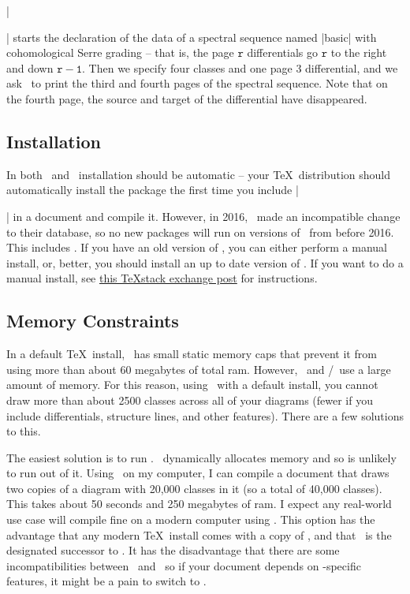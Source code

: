 \codeverb|\begin{sseqdata}[name = basic, cohomological Serre grading]| starts the declaration of the data of a spectral sequence named |basic| with cohomological Serre grading -- that is, the page $\mathtt{r}$ differentials go $\mathtt{r}$ to the right and down $\mathtt{r-1}$. Then we specify four classes and one page 3 differential, and we ask \sseqpages\  to print the third and fourth pages of the spectral sequence. Note that on the fourth page, the source and target of the differential have disappeared.

\subsection{Installation}
In both \miktex\ and \texlive\ installation should be automatic -- your \TeX\ distribution should automatically install the package the first time you include |\usepackage{spectralsequences}| in a document and compile it. However, in 2016, \texlive\ made an incompatible change to their database, so no new packages will run on versions of \texlive\ from before 2016. This includes \sseqpages. If you have an old version of \texlive, you can either perform a manual install,
or, better, you should install an up to date version of \texlive. If you want to do a manual install, see \href{https://tex.stackexchange.com/a/73017}{this \TeX stack exchange post} for instructions.

\subsection{Memory Constraints}
In a default \TeX\ install, \pdfLaTeX\ has small static memory caps that prevent it from using more than about 60 megabytes of total ram. However, \spectralsequences\ and \pgfpkg/\tikzpkg\ use a large amount of memory. For this reason, using \pdfLaTeX\ with a default install, you cannot draw more than about 2500 classes across all of your diagrams (fewer if you include differentials, structure lines, and other features). There are a few solutions to this.

The easiest solution is to run \LuaLaTeX. \LuaLaTeX\ dynamically allocates memory and so is unlikely to run out of it. Using \LuaLaTeX\ on my computer, I can compile a document that draws two copies of a diagram with 20,000 classes in it (so a total of 40,000 classes). This takes about 50 seconds and 250 megabytes of ram. I expect any real-world use case will compile fine on a modern computer using \LuaLaTeX. This option has the advantage that any modern \TeX\ install comes with a copy of \LuaLaTeX, and that \LuaLaTeX\ is the designated successor to \pdfLaTeX. It has the disadvantage that there are some incompatibilities between \LuaLaTeX\ and \pdfLaTeX\ so if your document depends on \pdfLaTeX-specific features, it might be a pain to switch to \LuaLaTeX.


\end{sseqdata}
